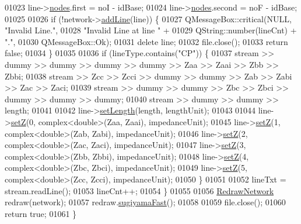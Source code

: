 \begin{DoxyCode}
01023     line->\hyperlink{class_line_afd17c40d656e6a8d677cb22df5f0c70b}{nodes}.first = noI - idBase;
01024     line->\hyperlink{class_line_afd17c40d656e6a8d677cb22df5f0c70b}{nodes}.second = noF - idBase;
01025 
01026     \textcolor{keywordflow}{if} (!network->\hyperlink{group___models_gae02945131494987b3ff9b59b627719b4}{addLine}(line)) \{
01027       QMessageBox::critical(NULL, \textcolor{stringliteral}{"Invalid Line."},
01028                             \textcolor{stringliteral}{"Invalid Line at line "} +
01029                             QString::number(lineCnt) + \textcolor{stringliteral}{"."},
01030                             QMessageBox::Ok);
01031       \textcolor{keyword}{delete} line;
01032       file.close();
01033       \textcolor{keywordflow}{return} \textcolor{keyword}{false};
01034     \}
01035 
01036     \textcolor{keywordflow}{if} (lineType.contains(\textcolor{stringliteral}{"CP"})) \{
01037       stream >> dummy >> dummy >> dummy >> dummy >> Zaa >> Zaai >> Zbb >> Zbbi;
01038       stream >> Zcc >> Zcci >> dummy >> dummy >> Zab >> Zabi >> Zac >> Zaci;
01039       stream >> dummy >> dummy >> Zbc >> Zbci >> dummy >> dummy >> dummy;
01040       stream >> dummy >> dummy >> length;
01041 
01042       line->\hyperlink{group___models_ga950d0b8f5d167eda430c65ca7adadbb0}{setLength}(length, lengthUnit);
01043 
01044       line->\hyperlink{group___models_ga2b8fe47ae4ae2d4422d9431e17b4927d}{setZ}(0, complex<double>(Zaa, Zaai), impedanceUnit);
01045       line->\hyperlink{group___models_ga2b8fe47ae4ae2d4422d9431e17b4927d}{setZ}(1, complex<double>(Zab, Zabi), impedanceUnit);
01046       line->\hyperlink{group___models_ga2b8fe47ae4ae2d4422d9431e17b4927d}{setZ}(2, complex<double>(Zac, Zaci), impedanceUnit);
01047       line->\hyperlink{group___models_ga2b8fe47ae4ae2d4422d9431e17b4927d}{setZ}(3, complex<double>(Zbb, Zbbi), impedanceUnit);
01048       line->\hyperlink{group___models_ga2b8fe47ae4ae2d4422d9431e17b4927d}{setZ}(4, complex<double>(Zbc, Zbci), impedanceUnit);
01049       line->\hyperlink{group___models_ga2b8fe47ae4ae2d4422d9431e17b4927d}{setZ}(5, complex<double>(Zcc, Zcci), impedanceUnit);
01050     \}
01051 
01052     lineTxt = stream.readLine();
01053     lineCnt++;
01054   \}
01055 
01056   \hyperlink{class_redraw_network}{RedrawNetwork} redraw(network);
01057   redraw.\hyperlink{group___algorithms_ga94d53ddf8ee00c4ef6d56bb988333103}{sugiyamaFast}();
01058 
01059   file.close();
01060   \textcolor{keywordflow}{return} \textcolor{keyword}{true};
01061 \}
\end{DoxyCode}
